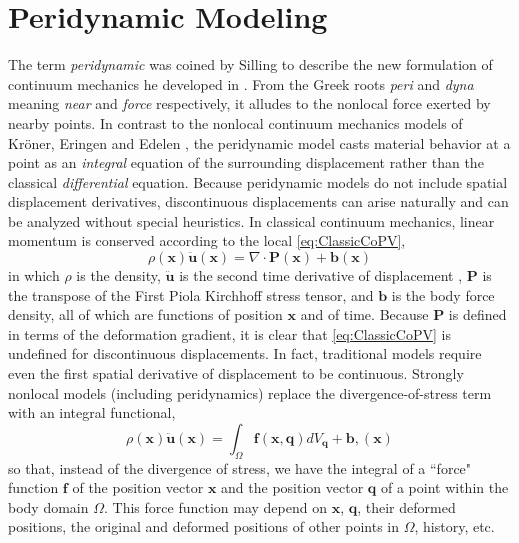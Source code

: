 \section{Peridynamic Modeling}
The term \textit{peridynamic} was coined by Silling to describe the new formulation of continuum mechanics he developed in \cite{silling2000reformulation}.
From the Greek roots \textit{peri} and \textit{dyna} meaning \textit{near} and \textit{force} respectively, it alludes to the nonlocal force exerted by nearby points.
In contrast to the nonlocal continuum mechanics models of Kr\"oner, Eringen and Edelen \cite{kroner1967elasticity,eringen1972nonlocal,eringen1983differential}, the peridynamic model casts material behavior at a point as an \textit{integral} equation of the surrounding displacement rather than the classical \textit{differential} equation.
Because peridynamic models do not include spatial displacement derivatives, discontinuous displacements can arise naturally and can be analyzed without special heuristics. 
In classical continuum mechanics, linear momentum is conserved according to the local  \cref{eq:ClassicCoPV},
%
\begin{equation}
\label{eq:ClassicCoPV}
\rho(\mathbf{x})\ddot{\mathbf{u}}(\mathbf{x}) = \nabla \cdot \mathbf{P}(\mathbf{x}) + \mathbf{b}(\mathbf{x})
\end{equation}
%
in which $\rho$ is the density, $\ddot{\mathbf{u}}$ is the second time derivative of displacement , $\mathbf{P}$ is the transpose of the First Piola Kirchhoff stress tensor, and $\mathbf{b}$ is the body force density, all of which are functions of position $\mathbf{x}$ and of time. 
Because \(\mathbf{P}\) is defined in terms of the deformation gradient, it is clear that \cref{eq:ClassicCoPV} is undefined for discontinuous displacements. 
In fact, traditional models require even the first spatial derivative of displacement to be continuous.
Strongly nonlocal models (including peridynamics) replace the divergence-of-stress term with an integral functional,
%
\begin{equation}
\label{eq:PDCoPV}
\rho(\mathbf{x})\ddot{\mathbf{u}}(\mathbf{x}) = \int_\Omega \mathbf{f}(\mathbf{x},\mathbf{q}) dV_\mathbf{q}  + \mathbf{b},(\mathbf{x})
\end{equation}
%
so that, instead of the divergence of stress, we have the integral of a ``force" function $\mathbf{f}$ of the position vector $\mathbf{x}$ and the position vector $\mathbf{q}$ of a point within the body domain $\Omega$. 
This force function may depend on \(\mathbf{x}\), \(\mathbf{q}\), their deformed positions, the original and deformed positions of other points in \(\Omega\), history, etc.
